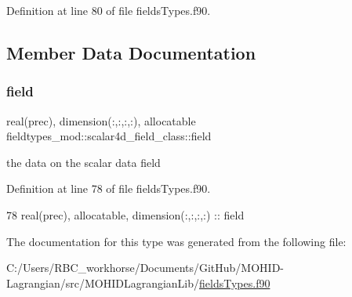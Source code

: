 Definition at line 80 of file fields\+Types.\+f90.



\subsection{Member Data Documentation}
\mbox{\label{structfieldtypes__mod_1_1scalar4d__field__class_aa0022774a139bc2d79c23fce42ab167a}} 
\subsubsection{\texorpdfstring{field}{field}}
{\footnotesize\ttfamily real(prec), dimension(\+:,\+:,\+:,\+:), allocatable fieldtypes\+\_\+mod\+::scalar4d\+\_\+field\+\_\+class\+::field\hspace{0.3cm}{\ttfamily [private]}}



the data on the scalar data field 



Definition at line 78 of file fields\+Types.\+f90.


\begin{DoxyCode}
78         \textcolor{keywordtype}{real(prec)}, \textcolor{keywordtype}{allocatable}, \textcolor{keywordtype}{dimension(:,:,:,:)} :: field
\end{DoxyCode}


The documentation for this type was generated from the following file\+:\begin{DoxyCompactItemize}
\item 
C\+:/\+Users/\+R\+B\+C\+\_\+workhorse/\+Documents/\+Git\+Hub/\+M\+O\+H\+I\+D-\/\+Lagrangian/src/\+M\+O\+H\+I\+D\+Lagrangian\+Lib/\mbox{\hyperlink{fields_types_8f90}{fields\+Types.\+f90}}\end{DoxyCompactItemize}
